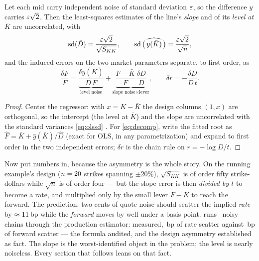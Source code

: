 \documentclass[11pt]{article}
\begin{document}
\begin{proposition}
\label{prop:ols}
Let each mid carry independent noise of standard deviation $\varepsilon$, so the
difference $y$ carries $\varepsilon\sqrt2$.  Then the least-squares estimates of
the line's \emph{slope} and of its \emph{level at $\bar K$} are
uncorrelated, with
\begin{equation}
\operatorname{sd}(\hat D)=\frac{\varepsilon\sqrt2}{\sqrt{S_{KK}}},
\qquad
\operatorname{sd}\big(\widehat{\,y(\bar K)\,}\big)=\frac{\varepsilon\sqrt2}{\sqrt n},
\label{eq:olssd}
\end{equation}
and the induced errors on the two market parameters separate, to first
order, as
\begin{equation}
\frac{\delta F}{F}
=\underbrace{\frac{\delta y(\bar K)}{D\,F}}_{\text{level noise}}
+\underbrace{\frac{F-\bar K}{F}\,\frac{\delta D}{D}}_{\text{slope noise}
\times\text{lever}},
\qquad
\delta r=-\frac{\delta D}{D\,t}.
\label{eq:decomp}
\end{equation}
\end{proposition}

\begin{proof}
Center the regressor: with $x=K-\bar K$ the design columns $(1,x)$ are
orthogonal, so the intercept (the level at $\bar K$) and the slope are
uncorrelated with the standard variances \eqref{eq:olssd}
\cite{SeberLee2003}.  For \eqref{eq:decomp}, write the fitted root as
$\hat F=\bar K+\hat y(\bar K)/\hat D$ (exact for OLS, in any
parametrization) and expand to first order in the two independent errors;
$\delta r$ is the chain rule on $r=-\log D/t$.
\end{proof}

Now put numbers in, because the asymmetry is the whole story.  On the
running example's design ($n=20$ strikes spanning
$\pm20\%$), $\sqrt{S_{KK}}$ is of order fifty strike-dollars while
$\sqrt n$ is of order four --- but the slope error is then \emph{divided
by $t$} to become a rate, and multiplied only by the small lever
$F-\bar K$ to reach the forward.  The prediction: two cents of quote noise
should scatter the implied \emph{rate} by
$\approx11$\,bp while the \emph{forward} moves by well
under a basis point.   runs \fwdinfmcn\ noisy chains
through the production estimator: measured, \fwdinfmcratesd\,bp of rate
scatter against \fwdinfmcfwdsd\,bp of forward scatter --- the formula
audited, and the design asymmetry established as fact.  The slope is the
worst-identified object in the problem; the level is nearly noiseless.
Every section that follows leans on that fact.
\end{document}
